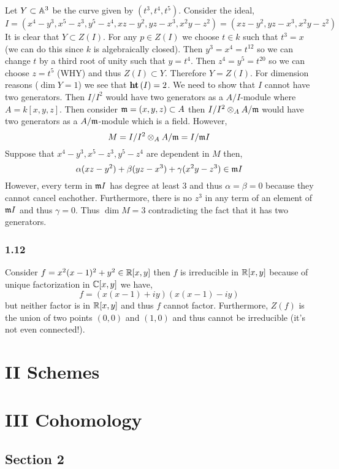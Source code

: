 \documentclass[12pt]{article}
\begin{document}
Let $Y \subset \mathbb{A}^3$ be the curve given by $(t^3, t^4, t^5)$. Consider the ideal,
\[ I = (x^4 - y^3, x^5 - z^3, y^5 - z^4, xz - y^2, yz - x^3, x^2 y - z^2) = (xz - y^2, yz - x^3, x^2 y - z^2) \]
It is clear that $Y \subset Z(I)$. For any $p \in Z(I)$ we choose $t \in k$ such that $t^3 = x$ (we can do this since $k$ is algebraically closed). Then $y^3 = x^4 = t^{12}$ so we can change $t$ by a third root of unity such that $y = t^4$. Then $z^4 = y^5 = t^{20}$ so we can choose $z = t^5$ (WHY) and thus $Z(I) \subset Y$. Therefore $Y = Z(I)$. For dimension reasons ($\dim{Y} = 1$) we see that $\mathbf{ht}\left( I \right) = 2$. We need to show that $I$ cannot have two generators. Then $I/I^2$ would have two generators as a $A/I$-module where $A = k[x,y,z]$. Then consider $\mathfrak{m} = (x,y,z) \subset A$ then $I/I^2 \otimes_A A / \mathfrak{m}$ would have two generators as a $A / \mathfrak{m}$-module which is a field. However,
\[ M = I/I^2 \otimes_A A / \mathfrak{m} = I/\mathfrak{m} I \]
Suppose that $x^4 - y^3, x^5 - z^3, y^5 - z^4$ are dependent in $M$ then,
\[ \alpha (xz - y^2) + \beta (yz - x^3) + \gamma (x^2 y - z^3) \in \mathfrak{m} I \]
However, every term in $\mathfrak{m}  I$ has degree at least $3$ and thus $\alpha = \beta = 0$ because they cannot cancel eachother. Furthermore, there is no $z^3$ in any term of an element of $\mathfrak{m} I$ and thus $\gamma = 0$. Thus $\dim{M} = 3$ contradicting the fact that it has two generators.

\subsubsection{1.12}

Consider $f = x^2(x-1)^2 + y^2 \in \mathbb{R}[x,y]$ then $f$ is irreducible in $\mathbb{R}[x,y]$ because of unique factorization in $\mathbb{C}[x,y]$ we have,
\[ f = (x(x-1) + i y)(x(x-1) - iy) \]
but neither factor is in $\mathbb{R}[x,y]$ and thus $f$ cannot factor. Furthermore, $Z(f)$ is the union of two points $(0,0)$ and $(1,0)$ and thus cannot be irreducible (it's not even connected!).  

\section{II Schemes}

\section{III Cohomology}

\subsection{Section 2}
\end{document}

